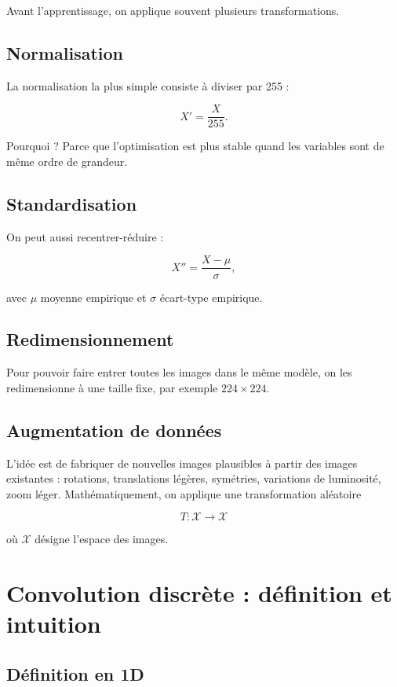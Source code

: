 \documentclass[11pt,a4paper]{article}
\begin{document}
Avant l'apprentissage, on applique souvent plusieurs transformations.

\subsection{Normalisation}

La normalisation la plus simple consiste à diviser par 255 :

\[
X' = \frac{X}{255}.
\]

Pourquoi ? Parce que l'optimisation est plus stable quand les variables sont de même ordre de grandeur.

\subsection{Standardisation}

On peut aussi recentrer-réduire :

\[
X'' = \frac{X - \mu}{\sigma},
\]

avec $\mu$ moyenne empirique et $\sigma$ écart-type empirique.

\subsection{Redimensionnement}

Pour pouvoir faire entrer toutes les images dans le même modèle, on les redimensionne à une taille fixe, par exemple $224 \times 224$.

\subsection{Augmentation de données}

L'idée est de fabriquer de nouvelles images plausibles à partir des images existantes : rotations, translations légères, symétries, variations de luminosité, zoom léger. Mathématiquement, on applique une transformation aléatoire

\[
T : \mathcal{X} \to \mathcal{X}
\]

où $\mathcal{X}$ désigne l'espace des images.

\section{Convolution discrète : définition et intuition}

\subsection{Définition en 1D}
\end{document}
